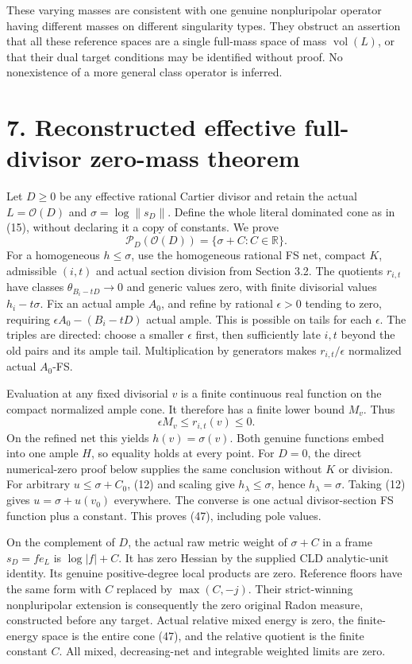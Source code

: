 \documentclass[
  10pt,
]{article}
\begin{document}
These varying masses are consistent with one genuine nonpluripolar
operator having different masses on different singularity types. They
obstruct an assertion that all these reference spaces are a single
full-mass space of mass \(\operatorname{vol}(L)\), or that their dual
target conditions may be identified without proof. No nonexistence of a
more general class operator is inferred.

\section{7. Reconstructed effective full-divisor zero-mass
theorem}\label{reconstructed-effective-full-divisor-zero-mass-theorem}

Let \(D\geq0\) be any effective rational Cartier divisor and retain the
actual \(L=\mathcal O(D)\) and \(\sigma=\log\|s_D\|\). Define the whole
literal dominated cone as in (15), without declaring it a copy of
constants. We prove
\[\mathcal P_D(\mathcal O(D))=\{\sigma+C:C\in\mathbb R\}.\tag{47}\] For
a homogeneous \(h\leq\sigma\), use the homogeneous rational FS net,
compact \(K\), admissible \((i,t)\) and actual section division from
Section 3.2. The quotients \(r_{i,t}\) have classes
\(\theta_{B_i-tD}\to0\) and generic values zero, with finite divisorial
values \(h_i-t\sigma\). Fix an actual ample \(A_0\), and refine by
rational \(\epsilon>0\) tending to zero, requiring
\(\epsilon A_0-(B_i-tD)\) actual ample. This is possible on tails for
each \(\epsilon\). The triples are directed: choose a smaller
\(\epsilon\) first, then sufficiently late \(i,t\) beyond the old pairs
and its ample tail. Multiplication by generators makes
\(r_{i,t}/\epsilon\) normalized actual \(A_0\)-FS.

Evaluation at any fixed divisorial \(v\) is a finite continuous real
function on the compact normalized ample cone. It therefore has a finite
lower bound \(M_v\). Thus \[\epsilon M_v\leq r_{i,t}(v)\leq0.\tag{48}\]
On the refined net this yields \(h(v)=\sigma(v)\). Both genuine
functions embed into one ample \(H\), so equality holds at every point.
For \(D=0\), the direct numerical-zero proof below supplies the same
conclusion without \(K\) or division. For arbitrary \(u\leq\sigma+C_0\),
(12) and scaling give \(h_\lambda\leq\sigma\), hence
\(h_\lambda=\sigma\). Taking (12) gives \(u=\sigma+u(v_0)\) everywhere.
The converse is one actual divisor-section FS function plus a constant.
This proves (47), including pole values.

On the complement of \(D\), the actual raw metric weight of \(\sigma+C\)
in a frame \(s_D=f e_L\) is \(\log|f|+C\). It has zero Hessian by the
supplied CLD analytic-unit identity. Its genuine positive-degree local
products are zero. Reference floors have the same form with \(C\)
replaced by \(\max(C,-j)\). Their strict-winning nonpluripolar extension
is consequently the zero original Radon measure, constructed before any
target. Actual relative mixed energy is zero, the finite-energy space is
the entire cone (47), and the relative quotient is the finite constant
\(C\). All mixed, decreasing-net and integrable weighted limits are
zero.
\end{document}
